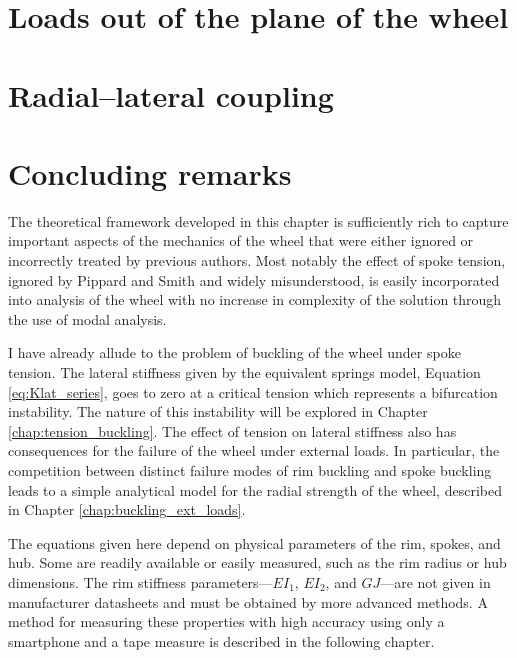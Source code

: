 \documentclass[\rootdir/thesis.tex]{subfiles}
\begin{document}
\section{Loads out of the plane of the wheel}
\label{sec:Lateral}


\section{Radial--lateral coupling}
\label{sec:coupling}



\section{Concluding remarks}

The theoretical framework developed in this chapter is sufficiently rich to capture important aspects of the mechanics of the wheel that were either ignored or incorrectly treated by previous authors. Most notably the effect of spoke tension, ignored by Pippard and Smith and widely misunderstood, is easily incorporated into analysis of the wheel with no increase in complexity of the solution through the use of modal analysis.

I have already allude to the problem of buckling of the wheel under spoke tension. The lateral stiffness given by the equivalent springs model, Equation \ref{eq:Klat_series}, goes to zero at a critical tension which represents a bifurcation instability. The nature of this instability will be explored in Chapter \ref{chap:tension_buckling}. The effect of tension on lateral stiffness also has consequences for the failure of the wheel under external loads. In particular, the competition between distinct failure modes of rim buckling and spoke buckling leads to a simple analytical model for the radial strength of the wheel, described in Chapter \ref{chap:buckling_ext_loads}.

The equations given here depend on physical parameters of the rim, spokes, and hub. Some are readily available or easily measured, such as the rim radius or hub dimensions. The rim stiffness parameters---$EI_1$, $EI_2$, and $GJ$---are not given in manufacturer datasheets and must be obtained by more advanced methods. A method for measuring these properties with high accuracy using only a smartphone and a tape measure is described in the following chapter.
\end{document}
